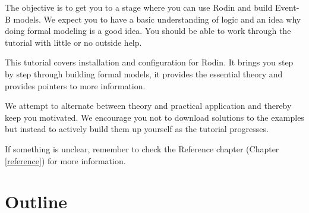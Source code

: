 
The objective is to get you to a stage where you can use Rodin and build Event-B models.  We expect you to have a basic understanding of logic and an idea why doing formal modeling is a good idea.  You should be able to work through the tutorial with little or no outside help.

This tutorial covers installation and configuration for Rodin. It brings you step by step through building formal models, it provides the essential theory and provides pointers to more information.

We attempt to alternate between theory and practical application and thereby keep you motivated.  We encourage you not to download solutions to the examples but instead to actively build them up yourself as the tutorial progresses.

If something is unclear, remember to check the Reference chapter (Chapter \ref{reference}) for more information.

\section{Outline}
\label{tut_outline}


